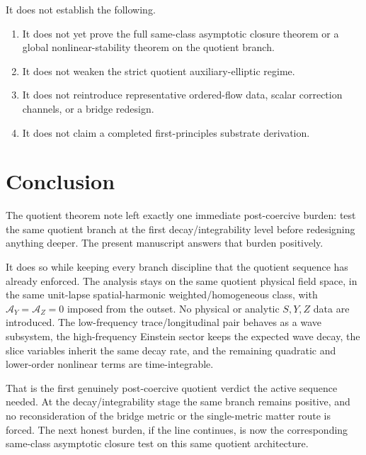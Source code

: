 \documentclass[11pt]{article}
\newcommand{\AY}{\mathcal A_Y}
\newcommand{\AZ}{\mathcal A_Z}
\begin{document}
It does not establish the following.
\begin{enumerate}
    \item It does not yet prove the full same-class asymptotic closure theorem or a global nonlinear-stability theorem on the quotient branch.
    \item It does not weaken the strict quotient auxiliary-elliptic regime.
    \item It does not reintroduce representative ordered-flow data, scalar correction channels, or a bridge redesign.
    \item It does not claim a completed first-principles substrate derivation.
\end{enumerate}

\section{Conclusion}

The quotient theorem note left exactly one immediate post-coercive burden: test the same quotient branch at the first decay/integrability level before redesigning anything deeper. The present manuscript answers that burden positively.

It does so while keeping every branch discipline that the quotient sequence has already enforced. The analysis stays on the same quotient physical field space, in the same unit-lapse spatial-harmonic weighted/homogeneous class, with \(\AY=\AZ=0\) imposed from the outset. No physical or analytic \(S,Y,Z\) data are introduced. The low-frequency trace/longitudinal pair behaves as a wave subsystem, the high-frequency Einstein sector keeps the expected wave decay, the slice variables inherit the same decay rate, and the remaining quadratic and lower-order nonlinear terms are time-integrable.

That is the first genuinely post-coercive quotient verdict the active sequence needed. At the decay/integrability stage the same branch remains positive, and no reconsideration of the bridge metric or the single-metric matter route is forced. The next honest burden, if the line continues, is now the corresponding same-class asymptotic closure test on this same quotient architecture.
\end{document}
